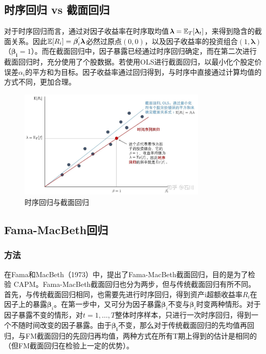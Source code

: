 \documentclass[11pt]{article}
\begin{document}
\subsection{时序回归 vs 截面回归}

对于时序回归而言，通过对因子收益率在时序取均值$\bm{\lambda} = \mathbb{E}_T[\bm{\lambda}_t]$，来得到隐含的截面关系。因此$\mathbb{E}[R_i] = \bm{\beta}_{i}^{'} \bm{\lambda}$必然过原点$(0,0)$，以及因子收益率的投资组合$(1,\bm{\lambda})$（$\bm{\beta_i}=1$）。而在截面回归中，因子暴露已经通过时序回归确定，而在第二次进行截面回归时，充分使用了个股数据。若使用OLS进行截面回归，以最小化个股定价误差$\alpha_i$的平方和为目标。因子收益率通过回归得到，与时序中直接通过计算均值的方式不同，更加合理。

\begin{figure}[H]
    \centering
    \includegraphics[width=0.8\textwidth]{fig/ts_vs_cs.jpg}
    \caption{时序回归与截面回归}
    \label{fig:ts_vs_cs}
\end{figure}

\subsection{Fama-MacBeth回归}

\subsubsection{方法}

在Fama和MacBeth（1973）中，提出了Fama-MacBeth截面回归，目的是为了检验 CAPM。Fama-MacBeth截面回归也分为两步，但与传统截面回归有所不同。首先，与传统截面回归相同，也需要先进行时序回归，得到资产i超额收益率$R_i$在因子上的暴露$\bm{\beta}_i$。在第一步中，又可分为因子暴露$\bm{\beta}_i$不变与$\bm{\beta}_i$时变两种情形。对于因子暴露不变的情形，对$t=1,\dots,T$整体时序样本，只进行一次时序回归，得到一个不随时间改变的因子暴露。由于$\bm{\beta_i}$不变，那么对于传统截面回归的先均值再回归，与FM截面回归的先回归再均值，两种方式在所有T期上得到的估计是相同的（但FM截面回归在检验上一定的优势）。
\end{document}
